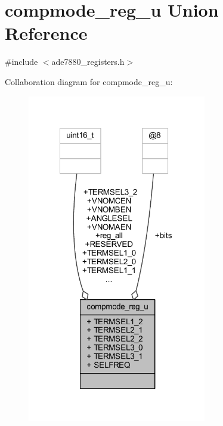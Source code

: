\hypertarget{a00021}{\section{compmode\-\_\-reg\-\_\-u Union Reference}
\label{de/d11/a00021}
}


{\ttfamily \#include $<$ade7880\-\_\-registers.\-h$>$}



Collaboration diagram for compmode\-\_\-reg\-\_\-u\-:\nopagebreak
\begin{figure}[H]
\begin{center}
\leavevmode
\includegraphics[width=221pt]{da/dec/a00080}
\end{center}
\end{figure}
